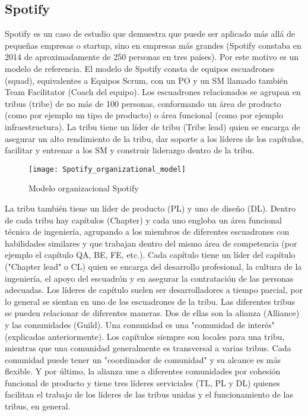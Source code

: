 \subsection{Spotify}

Spotify es un caso de estudio que demuestra que puede ser aplicado más allá de pequeñas empresas o startup, sino en empresas más grandes (Spotify constaba en 2014 de aproximadamente de 250 personas en tres países). Por este motivo es un modelo de referencia. El modelo de Spotify consta de equipos escuadrones (squad), equivalentes a Equipos Scrum, con un PO y un SM llamado también Team Facilitator (Coach del equipo). Los escuadrones relacionados se agrupan en tribus (tribe) de no más de 100 personas, conformando un área de producto (como por ejemplo un tipo de producto) o área funcional (como por ejemplo infraestructura). La tribu tiene un líder de tribu (Tribe lead) quien se encarga de asegurar un alto rendimiento de la tribu, dar soporte a los líderes de los capítulos, facilitar y entrenar a los SM y construir liderazgo dentro de la tribu. 

\begin{figure}[h]
  \centering
  \texttt{[image: Spotify\_organizational\_model]}
  \caption{Modelo organizacional Spotify}
  \centering
  \label{fig:Spotify_organizational_model} %
\end{figure}

La tribu también tiene un líder de producto (PL) y uno de diseño (DL). Dentro de cada tribu hay capítulos (Chapter) y cada uno engloba un área funcional técnica de ingeniería, agrupando a los miembros de diferentes escuadrones con habilidades similares y que trabajan dentro del mismo área de competencia (por ejemplo el capítulo QA, BE, FE, etc.). Cada capítulo tiene un líder del capítulo ("Chapter lead" o CL) quien se encarga del desarrollo profesional, la cultura de la ingeniería, el apoyo del escuadrón y en asegurar la contratación de las personas adecuadas. Los líderes de capítulo suelen ser desarrolladores a tiempo parcial, por lo general se sientan en uno de los escuadrones de la tribu. 
Las diferentes tribus se pueden relacionar de diferentes maneras. Dos de ellas son la alianza (Alliance) y las comunidades (Guild). Una comunidad es una "comunidad de interés" (explicadas anteriormente). Los capítulos siempre son locales para una tribu, mientras que una comunidad generalmente es transversal a varias tribus. Cada comunidad puede tener un "coordinador de comunidad" y su alcance es más flexible. Y por último, la alianza une a diferentes comunidades por cohesión funcional de producto y tiene tres líderes serviciales (TL, PL y DL) quienes facilitan el trabajo de los líderes de las tribus unidas y el funcionamiento de las tribus, en general.

